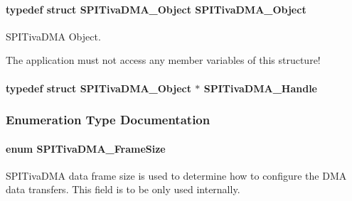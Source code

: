 \paragraph[{S\-P\-I\-Tiva\-D\-M\-A\-\_\-\-Object}]{\setlength{\rightskip}{0pt plus 5cm}typedef struct {\bf S\-P\-I\-Tiva\-D\-M\-A\-\_\-\-Object}  {\bf S\-P\-I\-Tiva\-D\-M\-A\-\_\-\-Object}}\label{_s_p_i_tiva_d_m_a_8h_aa431693a87cbc8cced0555e211d34c2b}


S\-P\-I\-Tiva\-D\-M\-A Object. 

The application must not access any member variables of this structure! 
\paragraph[{S\-P\-I\-Tiva\-D\-M\-A\-\_\-\-Handle}]{\setlength{\rightskip}{0pt plus 5cm}typedef struct {\bf S\-P\-I\-Tiva\-D\-M\-A\-\_\-\-Object} $\ast$ {\bf S\-P\-I\-Tiva\-D\-M\-A\-\_\-\-Handle}}\label{_s_p_i_tiva_d_m_a_8h_a4848d0474d4445327fb598373df1a8e3}


\subsubsection{Enumeration Type Documentation}
\paragraph[{S\-P\-I\-Tiva\-D\-M\-A\-\_\-\-Frame\-Size}]{\setlength{\rightskip}{0pt plus 5cm}enum {\bf S\-P\-I\-Tiva\-D\-M\-A\-\_\-\-Frame\-Size}}\label{_s_p_i_tiva_d_m_a_8h_a65cb55b42cf383ece69876f50ba2d0a4}


S\-P\-I\-Tiva\-D\-M\-A data frame size is used to determine how to configure the D\-M\-A data transfers. This field is to be only used internally. 

